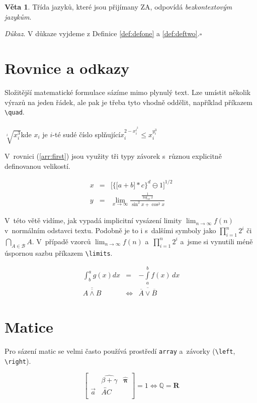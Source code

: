 \documentclass[a4paper, titlepage, twocolumn, 11pt]{article}
\theoremstyle{definition}
\theoremstyle{sentence}
\newtheorem{sent}{Věta}
\begin{document}
\begin{sent}
  Třída jazyků, které jsou přijímany ZA, odpovídá \emph{bezkontextovým jazykům}.
\end{sent}
\setlength\parindent{0pt}
\emph{Důkaz}. V důkaze vyjdeme z Definice \ref{def:defone} a \ref{def:deftwo}.\hfill\ensuremath{\square}
\section{Rovnice a odkazy}
Složitější matematické formulace sázíme mimo plynulý text. Lze umístit několik výrazů na jeden řádek, ale pak je třeba tyto vhodně oddělit, například příkazem \verb|\quad|.\\\\
$\sqrt[i]{x_i^3}$\quad  kde $x_i$ je $i$-té sudé číslo splňující\quad $x_i^{2-x_i^{i^2}} \leq x_i^{y_i^3}$
\setlength{\parindent}{1em}
\setlength{\parskip}{0.4em}
\par
V~rovnici (\ref{arr:first}) jsou využity tři typy závorek s~různou explicitně definovanou velikostí.

\begin{eqnarray}\label{arr:first}
  x&=&\bigg[\Big\{\big[a + b\big] * c\Big\}^d \ominus 1\bigg]^{1/2}\\
  y&=&\lim_{x \rightarrow \infty} \frac{\frac{1}{\log_{10}x}}{\sin^2x + \cos^2x}\nonumber
\end{eqnarray}
\par
V~této větě vidíme, jak vypadá implicitní vysázení limity $\lim_{n \rightarrow \infty} f(n)$ v~normálním odstavci textu. Podobně je to i s~dalšími symboly jako $\prod_{i=1}^n 2^i$ či $\bigcap_{A\in\mathcal{B}}A$. V~případě vzorců $\displaystyle\lim_{n \rightarrow \infty} f(n)$ a~$\prod\limits_{i=1}^{n}2^i$ a~jsme si vynutili méně úspornou sazbu příkazem \verb|\limits|.

\begin{eqnarray}
  \int_{b}^{a}g(x)dx&=&-\int\limits_{a}^{b}f(x)\,dx\\
  \overline{\overline {A\wedge B}}&\Leftrightarrow&\overline{\overline A \vee \overline B}
\end{eqnarray}

\section{Matice}
Pro sázení matic se velmi často používá prostředí \verb|array| a~závorky (\verb|\left|, \verb|\right|).

$$\left[\begin{array}{ccc}  &\widehat{\beta+\gamma}&\hat{\mathbf{\pi}}\\
\vec{a}&\overleftrightarrow{AC}& \\
\end{array}
\right]=1\Longleftrightarrow\mathbb{Q}=\mathbf{R}$$
\end{document}
